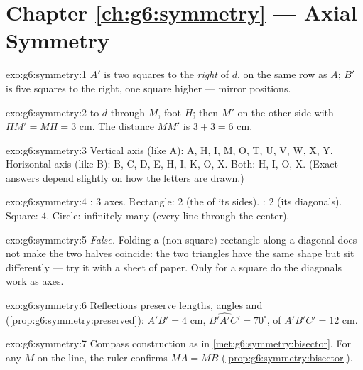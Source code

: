 \section*{Chapter \ref{ch:g6:symmetry} --- Axial Symmetry}

\begin{solution}{exo:g6:symmetry:1}
$A'$ is two squares to the \emph{right} of $d$, on the same row as
$A$; $B'$ is five squares to the right, one square higher --- mirror
positions.
\end{solution}

\begin{solution}{exo:g6:symmetry:2}
 to $d$ through $M$, foot $H$; then $M'$ on the other
side with $HM' = MH = 3$ cm. The distance $MM'$ is
$3 + 3 = 6$ cm.
\end{solution}

\begin{solution}{exo:g6:symmetry:3}
Vertical axis (like A): A, H, I, M, O, T, U, V, W, X, Y.
Horizontal axis (like B): B, C, D, E, H, I, K, O, X.
Both: H, I, O, X.
(Exact answers depend slightly on how the letters are drawn.)
\end{solution}

\begin{solution}{exo:g6:symmetry:4}
: $3$ axes. Rectangle: $2$ (the  of its sides). : $2$ (its diagonals). Square: $4$.
Circle: infinitely many (every line through the center).
\end{solution}

\begin{solution}{exo:g6:symmetry:5}
\emph{False.} Folding a (non-square) rectangle along a diagonal does
not make the two halves coincide: the two triangles have the same
shape but sit differently --- try it with a sheet of paper. Only for a
square do the diagonals work as axes.
\end{solution}

\begin{solution}{exo:g6:symmetry:6}
Reflections preserve lengths, angles and 
(\cref{prop:g6:symmetry:preserved}): $A'B' = 4$ cm,
$\widehat{B'A'C'} = 70^\circ$,  of $A'B'C' = 12$ cm.
\end{solution}

\begin{solution}{exo:g6:symmetry:7}
Compass construction as in \cref{met:g6:symmetry:bisector}. For any
$M$ on the line, the ruler confirms $MA = MB$
(\cref{prop:g6:symmetry:bisector}).
\end{solution}

